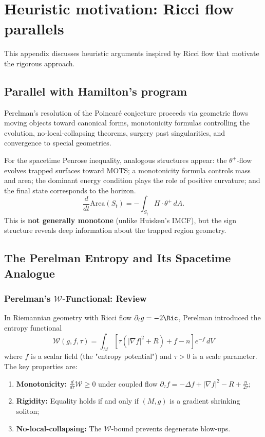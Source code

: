 \section{Heuristic motivation: Ricci flow parallels}
\label{app:RicciFlowPenrose}

This appendix discusses heuristic arguments inspired by Ricci flow that motivate the rigorous approach.

\subsection{Parallel with Hamilton's program}

Perelman's resolution of the Poincar\'e conjecture \cite{perelman2002,perelman2003} proceeds via geometric flows moving objects toward canonical forms, monotonicity formulas controlling the evolution, no-local-collapsing theorems, surgery past singularities, and convergence to special geometries.

For the spacetime Penrose inequality, analogous structures appear: the $\theta^+$-flow evolves trapped surfaces toward MOTS; a monotonicity formula controls mass and area; the dominant energy condition plays the role of positive curvature; and the final state corresponds to the horizon.
\begin{equation}
\frac{d}{dt}\mathrm{Area}(S_t) = -\int_{S_t} H \cdot \theta^+ \, dA.
\label{eq:area-evo-sign-app}
\end{equation}
This is \textbf{not generally monotone} (unlike Huisken's IMCF), but the sign structure reveals deep information about the trapped region geometry.

\subsection{The Perelman Entropy and Its Spacetime Analogue}

\subsubsection{Perelman's $\mathcal{W}$-Functional: Review}

In Riemannian geometry with Ricci flow $\partial_t g = -2\Ric$, Perelman introduced the entropy functional
\begin{equation}
\mathcal{W}(g, f, \tau) = \int_M \left[\tau\left(|\nabla f|^2 + R\right) + f - n\right]e^{-f} \, dV
\label{eq:perelman-W-app}
\end{equation}
where $f$ is a scalar field (the "entropy potential") and $\tau > 0$ is a scale parameter. The key properties are:
\begin{enumerate}[label=(\alph*)]
\item \textbf{Monotonicity:} $\frac{d}{d\tau}\mathcal{W} \geq 0$ under coupled flow $\partial_\tau f = -\Delta f + |\nabla f|^2 - R + \frac{n}{2\tau}$;
\item \textbf{Rigidity:} Equality holds if and only if $(M,g)$ is a gradient shrinking soliton;
\item \textbf{No-local-collapsing:} The $\mathcal{W}$-bound prevents degenerate blow-ups.
\end{enumerate}

